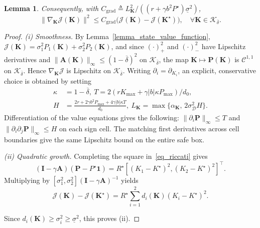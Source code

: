 \documentclass[10pt,a4paper]{amsart}
\newtheorem{lemma}{Lemma}
\newcommand{\Lemm}{Lemma}
\newcommand{\bA}{\mathbf{A}}
\newcommand{\bI}{\mathbf{I}}
\newcommand{\bK}{\mathbf{K}}
\newcommand{\bP}{\mathbf{P}}
\newcommand{\cD}{\mathcal{D}}
\newcommand{\cJ}{\mathcal{J}}
\newcommand{\cK}{\mathcal{K}}
\newcommand{\slo}{\underline{\sigma}}
\begin{document}
\begin{lemma}
    Consequently, with $C_{\mathrm{grad}} \triangleq {L_\bK^2}/{((r{+}\gamma b^2P^\star)\slo^{2})}$,
    \begin{equation} \label{eq_cgrad}
        \| \nabla_{\bK} \cJ(\bK)\|^2
        \le
        C_{\mathrm{grad}} \bigl( \cJ(\bK) - \cJ(\bK^\star) \bigr),
        \quad \forall \bK \in \cK_{\overline{\delta}}.
    \end{equation}
\end{lemma}

\begin{proof}
\emph{(i) Smoothness.} By \Lemm~\ref{lemma_state_value_function}, $\cJ(\bK)=\sigma_{1}^{2}P_{1}(\bK) + \sigma_{2}^{2}P_{2}(\bK)$, and since $(\cdot)_+^2$ and $(\cdot)_-^2$ have Lipschitz derivatives and $\|\bA(\bK)\|_\infty\le (1 - \overline{\delta})^2$ on $\cK_{\overline\delta}$, the map $\bK \mapsto \bP(\bK)$ is $\mathcal{C}^{1,1}$ on $\cK_{\overline{\delta}}$. Hence $\nabla_{\bK} \cJ$ is Lipschitz on $\cK_{\overline{\delta}}$.
Writing $\partial_i=\partial_{K_i}$, an explicit, conservative choice is obtained by setting
\vspace{-0.1cm}
\[
\begin{aligned}
\kappa&=1-\overline\delta, \ T={2(rK_{\max}+\gamma|b|\kappa P_{\max})}/{d_0},\\
H&=\frac{2r+2\gamma b^2P_{\max}+4\gamma|b|\kappa T}{d_0}, \
L_{\bK}{=}\max\{\alpha_{\bK},\,2\sigma_{\cD}^2H\}.
\end{aligned}
\]
Differentiation of the value equations gives the following:
$\|\partial_i\bP\|_\infty\le T$ and
$\|\partial_i\partial_j\bP\|_\infty\le H$ on each sign cell.
The matching first derivatives across cell boundaries give the same
Lipschitz bound on the entire safe box.

\emph{(ii) Quadratic growth.} Completing the square in~\eqref{eq_riccati} gives
\[
(\bI-\gamma\bA)(\bP-P^\star\mathbf1)
 =R^\star[(K_1-K^\star)^2,(K_2-K^\star)^2]^\top.
\]
Multiplying by $[\sigma_1^2,\sigma_2^2](\bI-\gamma\bA)^{-1}$ yields
\vspace{-0.1cm}
\begin{equation}\label{eq_exact_gap}
\cJ(\bK)-\cJ(\bK^\star)
 =R^\star\sum_{i=1}^2d_i(\bK)(K_i-K^\star)^2.
\end{equation}
\vspace{-0.3cm}

\noindent Since $d_i(\bK)\ge\sigma_i^2\ge\slo^2$, this proves (ii).


\end{proof}
\end{document}
